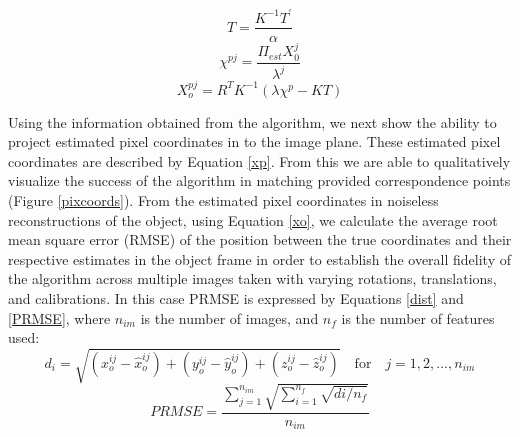 \documentclass[12pt]{article}
\begin{document}
\begin{multicols}{3}
	\begin{equation}\label{Teq}
		T = \dfrac{K^{-1}T^{'}}{\alpha}
	\end{equation}\break
	\begin{equation}\label{xp}
		\chi^{pj} = \dfrac{\Pi_{est} X_0^j}{\lambda^j}
	\end{equation}\break
	\begin{equation}\label{xo}
	X_o^{pj} = R^TK^{-1}(\lambda\chi^p-KT)
	\end{equation}\break
\end{multicols}


Using the information obtained from the algorithm, we next show the ability to project estimated pixel coordinates in to the image plane. These estimated pixel coordinates are described by Equation \ref{xp}.  From this we are able to qualitatively visualize the success of the algorithm in matching provided correspondence points (Figure \ref{pixcoords}). From the estimated pixel coordinates in noiseless reconstructions of the object, using Equation \ref{xo}, we calculate the average root mean square error (RMSE) of the position between the true coordinates and their respective estimates in the object frame in order to establish the overall fidelity of the algorithm across multiple images taken with varying rotations, translations, and calibrations. In this case PRMSE is expressed by Equations \ref{dist} and \ref{PRMSE}, where $n_{im}$ is the number of images, and $n_{f} $ is the number of features used:
\begin{equation}\label{dist}
d_i = \sqrt{(x_o^{ij}-\hat{x}_o^{ij})+(y_o^{ij}-\hat{y}_o^{ij})+(z_o^{ij}-\hat{z}_o^{ij})}\quad \text{for} \quad j=1,2,...,n_{im}
\end{equation}
\begin{equation}\label{PRMSE}
	PRMSE =\dfrac{\sum_{j=1}^{n_{im}}\sqrt{\sum_{i=1}^{n_f}\sqrt{di/n_f}}}{n_{im}}
\end{equation}
\end{document}
